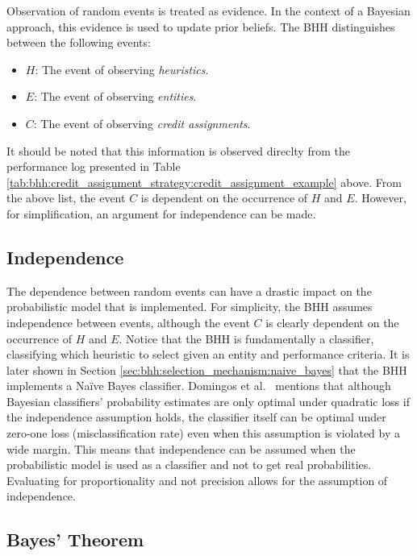 Observation of random events is treated as evidence. In the context of a Bayesian approach, this evidence is used to update prior beliefs. The \ac{BHH} distinguishes between the following events:

\begin{itemize}
      \item \textbf{$H$}: The event of observing \textit{heuristics}.
      \item \textbf{$E$}: The event of observing \textit{entities}.
      \item \textbf{$C$}: The event of observing \textit{credit assignments}.
\end{itemize}

It should be noted that this information is observed direclty from the performance log presented in Table \ref{tab:bhh:credit_assignment_strategy:credit_assignment_example} above. From the above list, the event $C$ is dependent on the occurrence of $H$ and $E$. However, for simplification, an argument for independence can be made.

\subsection{Independence}
\label{sec:bhh:selection_mechanism:independence}

The dependence between random events can have a drastic impact on the probabilistic model that is implemented. For simplicity, the \ac{BHH} assumes independence between events, although the event $C$ is clearly dependent on the occurrence of $H$ and $E$. Notice that the \ac{BHH} is fundamentally a classifier, classifying which heuristic to select given an entity and performance criteria. It is later shown in Section \ref{sec:bhh:selection_mechanism:naive_bayes} that the \ac{BHH} implements a Naïve Bayes classifier. Domingos et al.~\cite{ref:domingos:1997} mentions that although Bayesian classifiers’ probability estimates are only optimal under quadratic loss if the independence assumption holds, the classifier itself can be optimal under zero-one loss (misclassification rate) even when this assumption is violated by a wide margin. This means that independence can be assumed when the probabilistic model is used as a classifier and not to get real probabilities. Evaluating for proportionality and not precision allows for the assumption of independence.

\subsection{Bayes' Theorem}
\label{sec:bhh:selection_mechanism:bayes_theorem}

